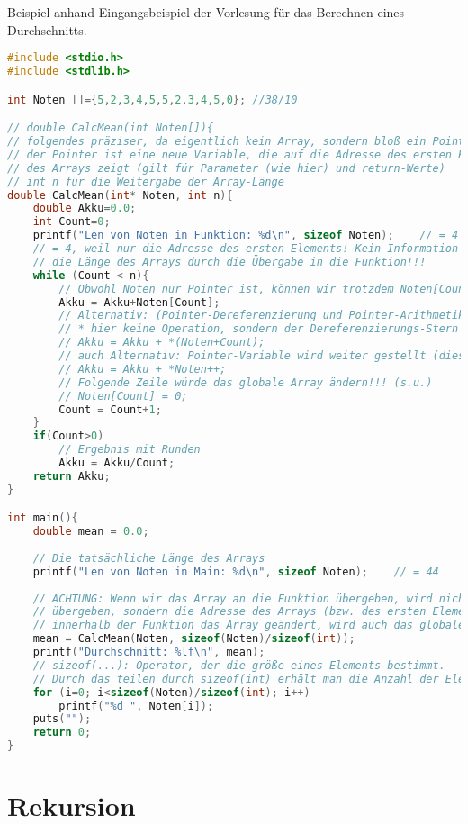 Beispiel anhand Eingangsbeispiel der Vorlesung für das Berechnen eines Durchschnitts.

\begin{lstlisting}[language=C]
#include <stdio.h>
#include <stdlib.h>

int Noten []={5,2,3,4,5,5,2,3,4,5,0}; //38/10

// double CalcMean(int Noten[]){
// folgendes präziser, da eigentlich kein Array, sondern bloß ein Pointer übergeben wird, 
// der Pointer ist eine neue Variable, die auf die Adresse des ersten Elements
// des Arrays zeigt (gilt für Parameter (wie hier) und return-Werte)
// int n für die Weitergabe der Array-Länge
double CalcMean(int* Noten, int n){	
	double Akku=0.0;
	int Count=0;
	printf("Len von Noten in Funktion: %d\n", sizeof Noten);	// = 4
	// = 4, weil nur die Adresse des ersten Elements! Kein Information über 
	// die Länge des Arrays durch die Übergabe in die Funktion!!!
	while (Count < n){
		// Obwohl Noten nur Pointer ist, können wir trotzdem Noten[Count] verwenden
		Akku = Akku+Noten[Count];
		// Alternativ: (Pointer-Dereferenzierung und Pointer-Arithmetik)
		// * hier keine Operation, sondern der Dereferenzierungs-Stern
		// Akku = Akku + *(Noten+Count);
		// auch Alternativ: Pointer-Variable wird weiter gestellt (diese ist nicht global)
		// Akku = Akku + *Noten++;
		// Folgende Zeile würde das globale Array ändern!!! (s.u.)		
		// Noten[Count] = 0;
		Count = Count+1;
	}
	if(Count>0)
		// Ergebnis mit Runden
		Akku = Akku/Count;
	return Akku;
}

int main(){
	double mean = 0.0;
	
	// Die tatsächliche Länge des Arrays
	printf("Len von Noten in Main: %d\n", sizeof Noten);	// = 44
	
	// ACHTUNG: Wenn wir das Array an die Funktion übergeben, wird nicht das Array selbst
	// übergeben, sondern die Adresse des Arrays (bzw. des ersten Elements)! Wird also 
	// innerhalb der Funktion das Array geändert, wird auch das globale Array geändert
	mean = CalcMean(Noten, sizeof(Noten)/sizeof(int));
	printf("Durchschnitt: %lf\n", mean);
	// sizeof(...): Operator, der die größe eines Elements bestimmt.
	// Durch das teilen durch sizeof(int) erhält man die Anzahl der Elemente 
	for (i=0; i<sizeof(Noten)/sizeof(int); i++)
		printf("%d ", Noten[i]);
	puts("");
	return 0;
}
\end{lstlisting}

\section{Rekursion}


